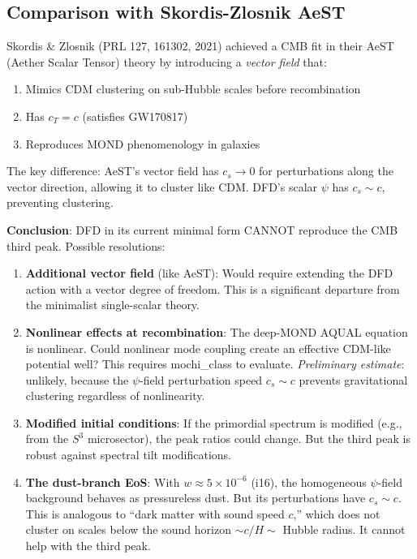\documentclass[11pt]{article}
\newcommand{\ee}[1]{\times 10^{#1}}
\begin{document}
\subsection{Comparison with Skordis-Zlosnik AeST}

Skordis \& Zlosnik (PRL 127, 161302, 2021) achieved a CMB fit in
their AeST (Aether Scalar Tensor) theory by introducing a
\textit{vector field} that:
\begin{enumerate}
\item Mimics CDM clustering on sub-Hubble scales before recombination
\item Has $c_T = c$ (satisfies GW170817)
\item Reproduces MOND phenomenology in galaxies
\end{enumerate}

The key difference: AeST's vector field has $c_s \to 0$ for
perturbations along the vector direction, allowing it to cluster
like CDM. DFD's scalar $\psi$ has $c_s \sim c$, preventing clustering.

\textbf{Conclusion}: DFD in its current minimal form CANNOT reproduce
the CMB third peak. Possible resolutions:
\begin{enumerate}
\item \textbf{Additional vector field} (like AeST): Would require
  extending the DFD action with a vector degree of freedom. This
  is a significant departure from the minimalist single-scalar theory.

\item \textbf{Nonlinear effects at recombination}: The deep-MOND
  AQUAL equation is nonlinear. Could nonlinear mode coupling create
  an effective CDM-like potential well? This requires mochi\_class
  to evaluate. \textit{Preliminary estimate}: unlikely, because the
  $\psi$-field perturbation speed $c_s \sim c$ prevents gravitational
  clustering regardless of nonlinearity.

\item \textbf{Modified initial conditions}: If the primordial spectrum
  is modified (e.g., from the $S^3$ microsector), the peak ratios
  could change. But the third peak is robust against spectral tilt
  modifications.

\item \textbf{The dust-branch EoS}: With $w \approx 5\ee{-6}$ (i16),
  the homogeneous $\psi$-field background behaves as pressureless
  dust. But its perturbations have $c_s \sim c$. This is analogous
  to ``dark matter with sound speed $c$,'' which does not cluster
  on scales below the sound horizon $\sim c/H \sim$ Hubble radius.
  It cannot help with the third peak.
\end{enumerate}
\end{document}
